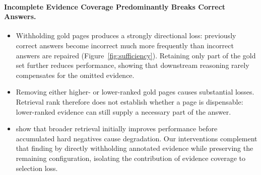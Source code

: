 \paragraph{Incomplete Evidence Coverage Predominantly Breaks Correct Answers.}
\begin{itemize}
    \item Withholding gold pages produces a strongly directional loss: previously correct answers become incorrect much more frequently than incorrect answers are repaired (Figure~\ref{fig:sufficiency}). Retaining only part of the gold set further reduces performance, showing that downstream reasoning rarely compensates for the omitted evidence.

    \item Removing either higher- or lower-ranked gold pages causes substantial losses. Retrieval rank therefore does not establish whether a page is dispensable: lower-ranked evidence can still supply a necessary part of the answer.

    \item \citeauthor{jin2025long} show that broader retrieval initially improves performance before accumulated hard negatives cause degradation. Our interventions complement that finding by directly withholding annotated evidence while preserving the remaining configuration, isolating the contribution of evidence coverage to selection loss.
\end{itemize}

